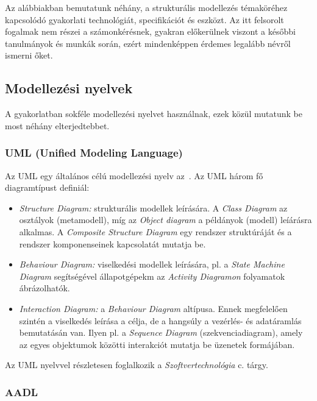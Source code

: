 Az alábbiakban bemutatunk néhány, a strukturális modellezés témaköréhez kapcsolódó gyakorlati technológiát, specifikációt és eszközt. Az itt felsorolt fogalmak nem részei a számonkérésnek, gyakran előkerülnek viszont a későbbi tanulmányok és munkák során, ezért mindenképpen érdemes legalább névről ismerni őket.

\subsection{Modellezési nyelvek}

A gyakorlatban sokféle modellezési nyelvet használnak, ezek közül mutatunk be most néhány elterjedtebbet.

\subsubsection{UML (Unified Modeling Language)}

Az UML egy általános célú modellezési nyelv az~\cite{UML}. Az UML három fő diagramtípust definiál:

\begin{itemize}
	\item \emph{Structure Diagram:} strukturális modellek leírására. A \emph{Class Diagram} az osztályok (metamodell), míg az \emph{Object diagram} a példányok (modell) leíárásra alkalmas. A \emph{Composite Structure Diagram} egy rendszer struktúráját és a rendszer komponenseinek kapcsolatát mutatja be.
	\item \emph{Behaviour Diagram:} viselkedési modellek leírására, pl. a \emph{State Machine Diagram} segítségével állapotgépekm az \emph{Activity Diagramon} folyamatok ábrázolhatók.
	\item \emph{Interaction Diagram:} a \emph{Behaviour Diagram} altípusa. Ennek megfelelően szintén a viselkedés leírása a célja, de a hangsúly a vezérlés- és adatáramlás bemutatásán van. Ilyen pl. a \emph{Sequence Diagram} (szekvenciadiagram), amely az egyes objektumok közötti interakciót mutatja be üzenetek formájában.
\end{itemize}


Az UML nyelvvel részletesen foglalkozik a \emph{Szoftvertechnológia} c. tárgy.

\subsubsection{AADL}

